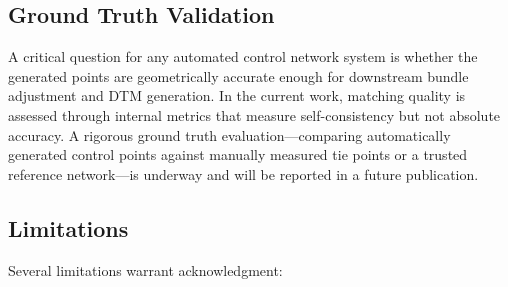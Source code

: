 \documentclass[lettersize,journal]{IEEEtran}
\begin{document}
\subsection{Ground Truth Validation}

A critical question for any automated control network system is whether the generated points are geometrically accurate enough for downstream bundle adjustment and DTM generation. In the current work, matching quality is assessed through internal metrics that measure self-consistency but not absolute accuracy. A rigorous ground truth evaluation---comparing automatically generated control points against manually measured tie points or a trusted reference network---is underway and will be reported in a future publication.

\subsection{Limitations}

Several limitations warrant acknowledgment:
\end{document}
